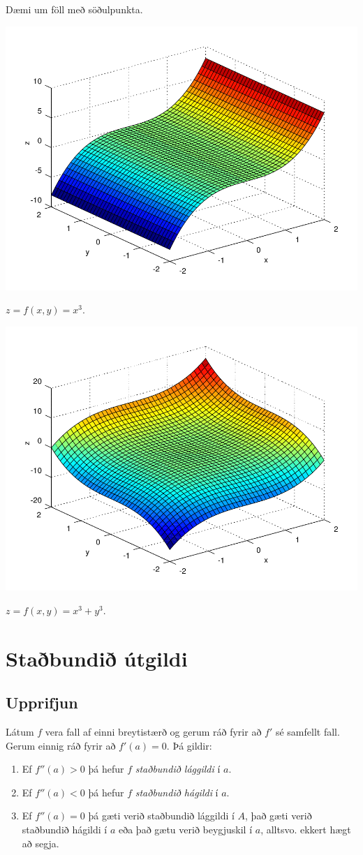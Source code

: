 \documentclass[a4paper,10pt,icelandic]{sphinxmanual}
\begin{document}
Dæmi um föll með söðulpunkta.

{\hfill\includegraphics[width=0.600\linewidth]{sodull1.png}\hfill}

\(z = f(x,y) = x^3\).

{\hfill\includegraphics[width=0.600\linewidth]{sodull2.png}\hfill}

\(z = f(x,y) = x^3+y^3\).


\section{Staðbundið útgildi}
\label{Kafli3:id3}

\subsection{Upprifjun}
\label{Kafli3:id4}
Látum \(f\) vera fall af einni breytistærð og gerum ráð fyrir að
\(f'\) sé samfellt fall. Gerum einnig ráð fyrir að \(f'(a)=0\).
Þá gildir:
\begin{enumerate}
\item {} 
Ef \(f''(a)>0\) þá hefur \(f\) \textit{staðbundið lággildi} í
\(a\).

\item {} 
Ef \(f''(a)<0\) þá hefur \(f\) \textit{staðbundið hágildi} í
\(a\).

\item {} 
Ef \(f''(a)=0\) þá gæti verið staðbundið lággildi í \(A\),
það gæti verið staðbundið hágildi í \(a\) eða það gætu verið
beygjuskil í \(a\), alltsvo. ekkert hægt að segja.

\end{enumerate}
\end{document}

